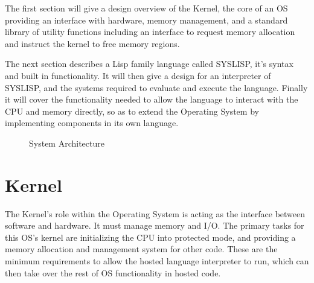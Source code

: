 \documentclass[10pt]{report}
\begin{document}
The first section will give a design overview of the Kernel, the core of an OS providing an interface with hardware, memory management, and a standard library of utility functions including an interface to request memory allocation and instruct the kernel to free memory regions.

The next section describes a Lisp family language called SYSLISP, it's syntax and built in functionality. It will then give a design for an interpreter of SYSLISP, and the systems required to evaluate and execute the language. Finally it will cover the functionality needed to allow the language to interact with the CPU and memory directly, so as to extend the Operating System by implementing components in its own language.

\begin{figure}[h]
  \centering
  \caption{System Architecture}
  \label{sysarch}
\end{figure}

\section{Kernel}
The Kernel's role within the Operating System is acting as the interface between software and hardware. It must manage memory and I/O. The primary tasks for this OS's kernel are initializing the CPU into protected mode, and providing a memory allocation and management system for other code. These are the minimum requirements to allow the hosted language interpreter to run, which can then take over the rest of OS functionality in hosted code.
\end{document}
